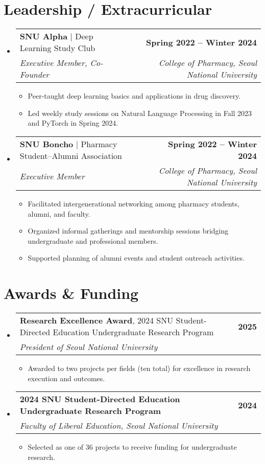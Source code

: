 \documentclass[letterpaper,11pt]{article}
\makeatletter
\newcommand{\resumeItem}[1]{
  \item\small{
    {#1 \vspace{-2pt}}
  }
}
\newcommand{\resumeSubheading}[4]{
  \vspace{-2pt}\item
    \begin{tabular*}{1.0\textwidth}[t]{l@{\extracolsep{\fill}}r}
      \textbf{#1} & \textbf{\small #2} \\
      \textit{\small#3} & \textit{\small #4} \\
    \end{tabular*}\vspace{-7pt}
}
\newcommand{\resumeSubheadingInline}[5]{
  \vspace{-2pt}\item
    \begin{tabular*}{1.0\textwidth}[t]{l@{\extracolsep{\fill}}r}
      	\textbf{#1}, {#2} & \textbf{\small #3} \\
      	\textit{\small#4} & \textit{\small #5} \\
    \end{tabular*}\vspace{-7pt}
}
\newcommand{\resumeSubheadingInlineTwo}[5]{
  \vspace{-2pt}\item
    \begin{tabular*}{1.0\textwidth}[t]{l@{\extracolsep{\fill}}r}
      	\textbf{#1} $|$ {#2} & \textbf{\small #3} \\
      	\textit{\small#4} & \textit{\small #5} \\
    \end{tabular*}\vspace{-7pt}
}
\newcommand{\resumeSubHeadingListStart}{\begin{itemize}[leftmargin=0.0in, label={}]}
\newcommand{\resumeSubHeadingListEnd}{\end{itemize}}
\newcommand{\resumeItemListStart}{\begin{itemize}[leftmargin=0.2in]}
\newcommand{\resumeItemListEnd}{\end{itemize}\vspace{-5pt}}
\makeatother
\begin{document}
\section{Leadership / Extracurricular}
    \resumeSubHeadingListStart
        \resumeSubheadingInlineTwo{SNU Alpha}{Deep Learning Study Club}{Spring 2022 -- Winter 2024}{Executive Member, Co-Founder}{College of Pharmacy, Seoul National University}
            \resumeItemListStart
                \resumeItem{Peer-taught deep learning basics and applications in drug discovery.}
                \resumeItem{Led weekly study sessions on Natural Language Processing in Fall 2023 and PyTorch in Spring 2024.}
            \resumeItemListEnd
        \resumeSubheadingInlineTwo{SNU Boncho}{Pharmacy Student–Alumni Association}{Spring 2022 -- Winter 2024}{Executive Member}{College of Pharmacy, Seoul National University}
            \resumeItemListStart
                \resumeItem{Facilitated intergenerational networking among pharmacy students, alumni, and faculty.}
                \resumeItem{Organized informal gatherings and mentorship sessions bridging undergraduate and professional members.}
                \resumeItem{Supported planning of alumni events and student outreach activities.}
            \resumeItemListEnd
    \resumeSubHeadingListEnd

\section{Awards \& Funding}
    \resumeSubHeadingListStart
        \resumeSubheadingInline{Research Excellence Award}{2024 SNU Student-Directed Education Undergraduate Research Program}{2025}{President of Seoul National University}{}
            \resumeItemListStart
                \resumeItem{Awarded to two projects per fields (ten total) for excellence in research execution and outcomes.}
            \resumeItemListEnd
        \resumeSubheading{2024 SNU Student-Directed Education Undergraduate Research Program}{2024}{Faculty of Liberal Education, Seoul National University}{}
            \resumeItemListStart
                \resumeItem{Selected as one of 36 projects to receive funding for undergraduate research.}
            \resumeItemListEnd
    \resumeSubHeadingListEnd
\end{document}
